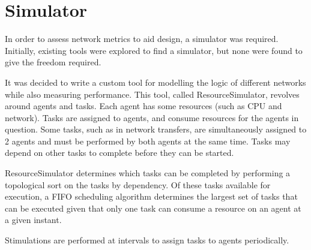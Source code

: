 \section{Simulator}
	\label{simulator}
	\justifying
	\setlength{\parskip}{0.6\baselineskip}
	\setlength{\parindent}{0pt}
	In order to assess network metrics to aid design, a simulator was required. Initially, existing tools were explored to find a simulator, but none were found to give the freedom required.
	
	It was decided to write a custom tool for modelling the logic of different networks while also measuring performance. This tool, called ResourceSimulator, revolves around agents and tasks. Each agent has some resources (such as CPU and network). Tasks are assigned to agents, and consume resources for the agents in question. Some tasks, such as in network transfers, are simultaneously assigned to 2 agents and must be performed by both agents at the same time. Tasks may depend on other tasks to complete before they can be started. 
	
	ResourceSimulator determines which tasks can be completed by performing a topological sort on the tasks by dependency. Of these tasks available for execution, a FIFO scheduling algorithm determines the largest set of tasks that can be executed given that only one task can consume a resource on an agent at a given instant.
	
	Stimulations are performed at intervals to assign tasks to agents periodically.
	\raggedright